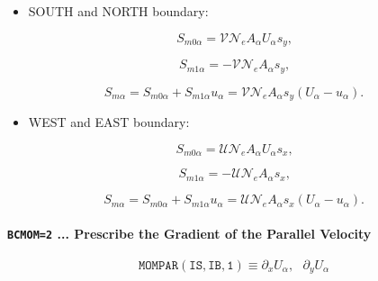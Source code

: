 \documentclass[11pt]{article}
\begin{document}
\bigskip

\begin{itemize}
\item  SOUTH and NORTH boundary:
\end{itemize}

\begin{equation}
S_{m0\alpha}=\mathcal{VN}_{e}A_{\alpha}U_{\alpha}s_{y}\text{,}   \label{c73}
\end{equation}

\begin{equation}
S_{m1\alpha}=-\mathcal{VN}_{e}A_{\alpha}s_{y}\text{,}   \label{c74}
\end{equation}

\begin{equation}
S_{m\alpha}=S_{m0\alpha}+S_{m1\alpha}u_{\alpha}=\mathcal{VN}_{e}A_{\alpha
}s_{y}\left( U_{\alpha}-u_{\alpha}\right) \text{.}   \label{c75}
\end{equation}

\begin{itemize}
\item  WEST and EAST boundary:
\end{itemize}

\begin{equation}
S_{m0\alpha}=\mathcal{UN}_{e}A_{\alpha}U_{\alpha}s_{x}\text{,}   \label{c76}
\end{equation}

\begin{equation}
S_{m1\alpha}=-\mathcal{UN}_{e}A_{\alpha}s_{x}\text{,}   \label{c77}
\end{equation}

\begin{equation}
S_{m\alpha}=S_{m0\alpha}+S_{m1\alpha}u_{\alpha}=\mathcal{UN}_{e}A_{\alpha
}s_{x}\left( U_{\alpha}-u_{\alpha}\right) \text{.}   \label{c78}
\end{equation}

\bigskip

\paragraph{\texttt{BCMOM=2} ... Prescribe the Gradient of the Parallel
Velocity}

\bigskip

\begin{equation*}
\mathtt{MOMPAR(IS,IB,1)}\equiv\partial_{x}U_{\alpha},\text{ }\partial
_{y}U_{\alpha}
\end{equation*}
\end{document}
